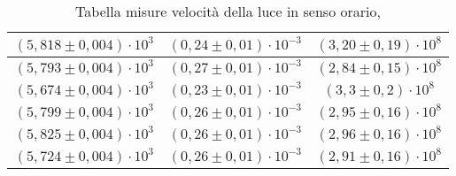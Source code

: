 \begin{table}[H]
\begin{tabular}{|c|c|c|}
        \hline
        $ (5,818 \pm 0,004) \cdot 10^{3} $ & $ (0,24 \pm 0,01) \cdot 10^{-3} $ & $ (3,20 \pm 0,19) \cdot 10^{8} $\\
        \hline
        $ (5,793 \pm 0,004) \cdot 10^{3} $ & $ (0,27 \pm 0,01) \cdot 10^{-3} $ & $ (2,84 \pm 0,15) \cdot 10^{8} $\\
        \hline
        $ (5,674 \pm 0,004) \cdot 10^{3} $ & $ (0,23 \pm 0,01) \cdot 10^{-3} $ & $ (3,3 \pm 0,2) \cdot 10^{8} $\\
        \hline
        $ (5,799 \pm 0,004) \cdot 10^{3} $ & $ (0,26 \pm 0,01) \cdot 10^{-3} $ & $ (2,95 \pm 0,16) \cdot 10^{8} $\\
        \hline
        $ (5,825 \pm 0,004) \cdot 10^{3} $ & $ (0,26 \pm 0,01) \cdot 10^{-3} $ & $ (2,96 \pm 0,16) \cdot 10^{8} $\\
        \hline
        $ (5,724 \pm 0,004) \cdot 10^{3} $ & $ (0,26 \pm 0,01) \cdot 10^{-3} $ & $ (2,91 \pm 0,16) \cdot 10^{8} $\\
        \hline
        \end{tabular}
    \caption{Tabella misure velocità della luce in senso orario,}
\end{table}
